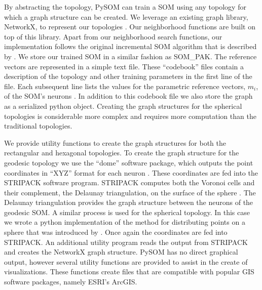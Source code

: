 By abstracting the topology, PySOM can train a SOM using any topology for
which a graph structure can be created. We leverage an existing graph library,
NetworkX, to represent our topologies \citep{networkx}.  Our neighborhood
functions are built on top of this library.  Apart from our neighborhood
search functions, our implementation follows the original incremental SOM
algorithm that is described by \cite{Kohonen2000}.  We store our trained SOM
in a similar fashion as SOM\_PAK.  The reference vectors are represented in a
simple text file.  These ``codebook'' files contain a description of the
topology and other training parameters in the first line of the file.  Each
subsequent line lists the values for the parametric reference vectors, $m_i$,
of the SOM's neurons \citep{kohonen1996}. In addition to this codebook file we
also store the graph as a serialized python object.  Creating the graph
structures for the spherical topologies is considerable more complex and
requires more computation than the traditional topologies.

We provide utility functions to create the graph structures for both the
rectangular and hexagonal topologies.  To create the graph structure for the
geodesic topology we use the ``dome'' software package, which outputs the
point coordinates in ``XYZ'' format for each neuron \citep{dome}.  These
coordinates are fed into the STRIPACK software program. STRIPACK computes both
the Voronoi cells and their complement, the Delaunay triangulation, on the
surface of the sphere \citep{Ranka97}.  The Delaunay triangulation provides the graph
structure between the neurons of the geodesic SOM.  A similar process is used
for the spherical topology. In this case we wrote a python implementation of
the method for distributing points on a sphere that was introduced by
\cite{Rakhmanov94}.  Once again the coordinates are fed into STRIPACK.
An additional utility program reads the output from STRIPACK and
creates the NetworkX graph structure.  PySOM has no direct graphical
output, however several utility functions are provided to assist in the
create of visualizations.  These functions create files that are compatible with
popular GIS software packages, namely ESRI's ArcGIS.

